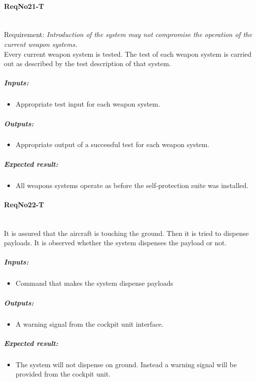 \paragraph{ReqNo21-T}\mbox{}\\ %
Requirement: \textit{Introduction of the system may not compromise the operation of the current weapon systems.}
\\
Every current weapon system is tested. The test of each weapon system is carried out as described by the test description of that system.

	\subparagraph{Inputs:}
	\begin{itemize}
	\item Appropriate test input for each weapon system.
	\end{itemize}
	\subparagraph{Outputs:}
	\begin{itemize}
	\item Appropriate output of a successful test for each weapon system.
	\end{itemize}
	\subparagraph{Expected result:}
	\begin{itemize}
	\item All weapons systems operate as before the self-protection suite was installed.
	\end{itemize}

\paragraph{ReqNo22-T}\mbox{}\\ %
It is assured that the aircraft is touching the ground. Then it is tried to dispense payloads. It is observed whether the system dispenses the payload or not.
\\
	\subparagraph{Inputs:}
	\begin{itemize}
	\item Command that makes the system dispense payloads 
	\end{itemize}
	\subparagraph{Outputs:}
	\begin{itemize}
	\item A warning signal from the cockpit unit interface.
	\end{itemize}
	\subparagraph{Expected result:}
	\begin{itemize}
	\item The system will not dispense on ground. Instead a warning signal will be provided from the cockpit unit.
	\end{itemize}

